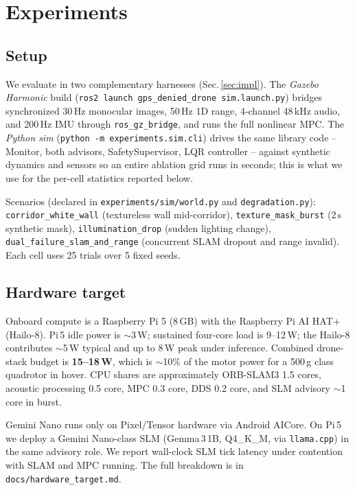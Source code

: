 \section{Experiments}
\label{sec:experiments}

\subsection{Setup}
We evaluate in two complementary harnesses (Sec.\,\ref{sec:impl}).
The \emph{Gazebo Harmonic} build (\texttt{ros2 launch
gps\_denied\_drone sim.launch.py}) bridges synchronized 30\,Hz
monocular images, 50\,Hz 1D range, 4-channel 48\,kHz audio, and
200\,Hz IMU through \texttt{ros\_gz\_bridge}, and runs the full
nonlinear MPC. The \emph{Python sim}
(\texttt{python -m experiments.sim.cli}) drives the same library
code -- Monitor, both advisors, SafetySupervisor, LQR controller --
against synthetic dynamics and sensors so an entire ablation grid
runs in seconds; this is what we use for the per-cell statistics
reported below.

Scenarios (declared in \texttt{experiments/sim/world.py} and
\texttt{degradation.py}):
\texttt{corridor\_white\_wall} (textureless wall mid-corridor),
\texttt{texture\_mask\_burst} (2\,s synthetic mask),
\texttt{illumination\_drop} (sudden lighting change),
\texttt{dual\_failure\_slam\_and\_range} (concurrent SLAM dropout
and range invalid). Each cell uses 25 trials over 5 fixed seeds.

\subsection{Hardware target}
Onboard compute is a Raspberry Pi 5 (8\,GB) with the Raspberry Pi
AI HAT+ (Hailo-8). Pi\,5 idle power is $\sim$3\,W; sustained four-core
load is 9--12\,W; the Hailo-8 contributes $\sim$5\,W typical and up to
8\,W peak under inference. Combined drone-stack budget is
\textbf{15--18\,W}, which is $\sim$10\% of the motor power for a
500\,g class quadrotor in hover. CPU shares are approximately
ORB-SLAM3 1.5 cores, acoustic processing 0.5 core, MPC 0.3 core,
DDS 0.2 core, and SLM advisory $\sim$1 core in burst.

Gemini Nano runs only on Pixel/Tensor hardware via Android AICore. On
Pi\,5 we deploy a Gemini Nano-class SLM (Gemma\,3\,1B, Q4\_K\_M, via
\texttt{llama.cpp}) in the same advisory role. We report wall-clock
SLM tick latency under contention with SLAM and MPC running. The full
breakdown is in \texttt{docs/hardware\_target.md}.

